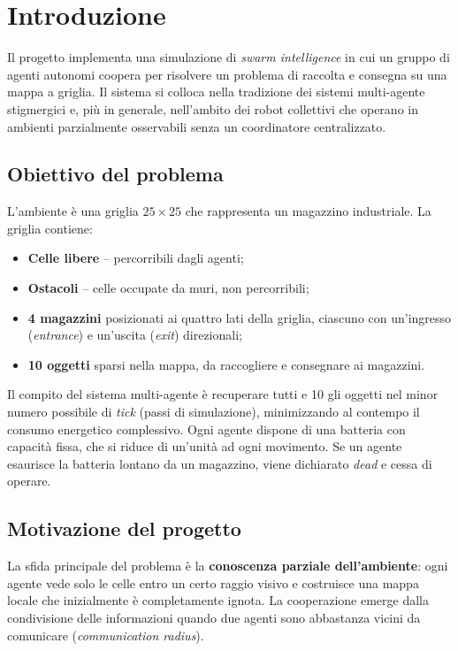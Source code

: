 \section{Introduzione}

Il progetto implementa una simulazione di \emph{swarm intelligence} in cui un gruppo di agenti autonomi coopera per risolvere un problema di raccolta e consegna su una mappa a griglia. Il sistema si colloca nella tradizione dei sistemi multi-agente stigmergici e, più in generale, nell'ambito dei robot collettivi che operano in ambienti parzialmente osservabili senza un coordinatore centralizzato.

\subsection{Obiettivo del problema}

L'ambiente è una griglia $25 \times 25$ che rappresenta un magazzino industriale. La griglia contiene:
\begin{itemize}
  \item \textbf{Celle libere} -- percorribili dagli agenti;
  \item \textbf{Ostacoli} -- celle occupate da muri, non percorribili;
  \item \textbf{4 magazzini} posizionati ai quattro lati della griglia, ciascuno con un'ingresso (\emph{entrance}) e un'uscita (\emph{exit}) direzionali;
  \item \textbf{10 oggetti} sparsi nella mappa, da raccogliere e consegnare ai magazzini.
\end{itemize}

Il compito del sistema multi-agente è recuperare tutti e 10 gli oggetti nel minor numero possibile di \emph{tick} (passi di simulazione), minimizzando al contempo il consumo energetico complessivo. Ogni agente dispone di una batteria con capacità fissa, che si riduce di un'unità ad ogni movimento. Se un agente esaurisce la batteria lontano da un magazzino, viene dichiarato \emph{dead} e cessa di operare.

\subsection{Motivazione del progetto}

La sfida principale del problema è la \textbf{conoscenza parziale dell'ambiente}: ogni agente vede solo le celle entro un certo raggio visivo e costruisce una mappa locale che inizialmente è completamente ignota. La cooperazione emerge dalla condivisione delle informazioni quando due agenti sono abbastanza vicini da comunicare (\emph{communication radius}).

